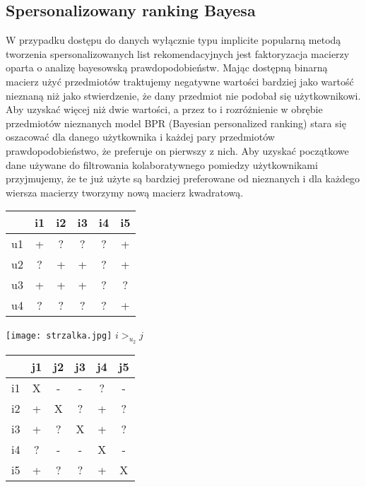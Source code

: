 \documentclass{pracamgr}
\begin{document}
   \subsection{Spersonalizowany ranking Bayesa}
    W przypadku dostępu do danych wyłącznie typu implicite popularną metodą tworzenia spersonalizowanych list rekomendacyjnych jest
    faktoryzacja macierzy oparta o analizę bayesowską prawdopodobieństw.\newline
    Mając dostępną binarną macierz użyć przedmiotów traktujemy negatywne wartości bardziej jako wartość nieznaną niż jako stwierdzenie,
    że dany przedmiot nie podobał się użytkownikowi. Aby uzyskać więcej niż dwie wartości, a przez to i rozróżnienie w obrębie przedmiotów nieznanych
    model BPR (Bayesian personalized ranking) stara się oszacować dla danego użytkownika i każdej pary przedmiotów prawdopodobieństwo,
    że preferuje on pierwszy z nich. Aby uzyskać początkowe dane używane do filtrowania kolaboratywnego pomiedzy użytkownikami
    przyjmujemy, że te już użyte są bardziej preferowane od nieznanych i dla każdego wiersza macierzy tworzymy nową macierz kwadratową.
     \begin{multicols}{3}
     \begin{tabular}{c|c|c|c|c|c|}
       & i1 & i2 & i3 & i4 & i5 \\
      \hline
      u1 & + & ? & ? & ? & + \\
      \hline
      u2 & ? & + & + & ? & + \\    
      \hline
      u3 & + & + & + & ? & ? \\
      \hline
      u4 & ? & ? & ? & ? & + \\    
     \end{tabular}
     \begin{center}
      \texttt{[image: strzalka.jpg]}\newline
      $i>_{u_2}j$
     \end{center}
     \begin{tabular}{c|c|c|c|c|c|}
       & j1 & j2 & j3 & j4 & j5 \\
      \hline
      i1 & X & - & - & ? & - \\
      \hline
      i2 & + & X & ? & + & ? \\    
      \hline
      i3 & + & ? & X & + & ? \\    
      \hline
      i4 & ? & - & - & X & - \\
      \hline
      i5 & + & ? & ? & + & X \\ 
     \end{tabular}
    \end{multicols}
\end{document}
